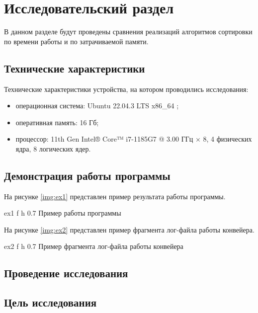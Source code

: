 \chapter{Исследовательский раздел}

В данном разделе будут проведены сравнения реализаций алгоритмов сортировки  по времени работы и по затрачиваемой памяти.

\section{Технические характеристики}

Технические характеристики устройства, на котором проводились исследования: 

\begin{itemize}[label=--]
	\item операционная система: Ubuntu 22.04.3 LTS x86\_64 \cite{info_os};
	\item оперативная память: 16 Гб;
	\item процессор: 11th Gen Intel® Core™ i7-1185G7 @ 3.00 ГГц × 8, 4 физических ядра, 8 логических ядер.
\end{itemize}

\section{Демонстрация работы программы}

На рисунке \ref{img:ex1} представлен пример результата работы программы. 

{ex1} %
{f} %
{h} %
{0.7\textwidth} %
{Пример работы программы} %

\clearpage
На рисунке \ref{img:ex2} представлен пример фрагмента лог-файла работы конвейера. 

{ex2} %
{f} %
{h} %
{0.7\textwidth} %
{Пример фрагмента лог-файла работы конвейера} %

\section{Проведение исследования}

\section*{Цель исследования}

